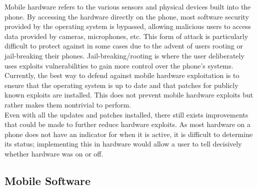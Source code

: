 Mobile hardware refers to the various sensors and physical devices built into the phone.
By accessing the hardware directly on the phone, most software security provided by the operating system is bypassed, allowing malicious users to access data provided by cameras, microphones, etc.
This form of attack is particularly difficult to protect against in some cases due to the advent of users rooting or jail-breaking their phones.\cite{Reference11}
Jail-breaking/rooting is where the user deliberately uses exploits vulnerabilities to gain more control over the phone’s systems.\\
Currently, the best way to defend against mobile hardware exploitation is to ensure that the operating system is up to date and that patches for publicly known exploits are installed.
This does not prevent mobile hardware exploits but rather makes them nontrivial to perform.\cite{Reference12}\\
Even with all the updates and patches installed, there still exists improvements that could be made to further reduce hardware exploits.
As most hardware on a phone does not have an indicator for when it is active, it is difficult to determine its status; implementing this in hardware would allow a user to tell decisively whether hardware was on or off.\cite{Reference13}


\subsection{Mobile Software}

\label{Ch2 Sec2 Sub2}

